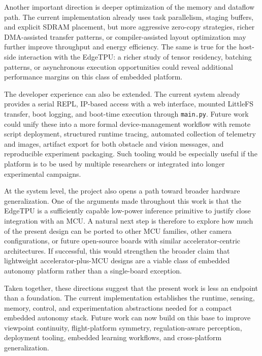 Another important direction is deeper optimization of the memory and
dataflow path. The current implementation already uses task parallelism,
staging buffers, and explicit SDRAM placement, but more aggressive
zero-copy strategies, richer DMA-assisted transfer patterns, or
compiler-assisted layout optimization may further improve throughput and
energy efficiency. The same is true for the host-side interaction with
the EdgeTPU: a richer study of tensor residency, batching patterns, or
asynchronous execution opportunities could reveal additional performance
margins on this class of embedded platform.

The developer experience can also be extended. The current system
already provides a serial REPL, IP-based access with a web interface,
mounted LittleFS transfer, boot logging, and boot-time execution through
\texttt{main.py}. Future work could unify these into a more formal
device-management workflow with remote script deployment, structured
runtime tracing, automated collection of telemetry and images, artifact
export for both obstacle and vision messages, and reproducible
experiment packaging. Such tooling would be especially useful if the
platform is to be used by multiple researchers or integrated into longer
experimental campaigns.

At the system level, the project also opens a path toward broader
hardware generalization. One of the arguments made throughout this work
is that the EdgeTPU is a sufficiently capable low-power inference
primitive to justify close integration with an MCU. A natural next step
is therefore to explore how much of the present design can be ported to
other MCU families, other camera configurations, or future open-source
boards with similar accelerator-centric architectures. If successful,
this would strengthen the broader claim that lightweight
accelerator-plus-MCU designs are a viable class of embedded autonomy
platform rather than a single-board exception.

Taken together, these directions suggest that the present work is less
an endpoint than a foundation. The current implementation establishes
the runtime, sensing, memory, control, and experimentation abstractions
needed for a compact embedded autonomy stack. Future work can now build
on this base to improve viewpoint continuity, flight-platform symmetry,
regulation-aware perception, deployment tooling, embedded learning
workflows, and cross-platform generalization.
